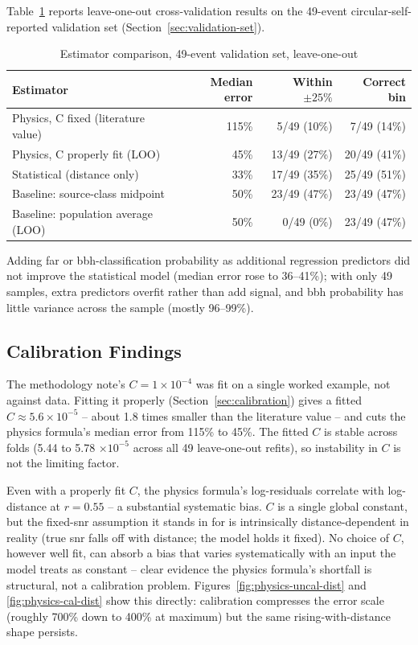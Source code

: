 Table~\ref{tab:results} reports leave-one-out cross-validation results on the 49-event circular-self-reported validation set (Section~\ref{sec:validation-set}).

\begin{table}[H]
\centering
\caption{Estimator comparison, 49-event validation set, leave-one-out}
\label{tab:results}
\begin{tabular}{@{}lrrr@{}}
\toprule
Estimator & Median error & Within $\pm25\%$ & Correct bin \\
\midrule
Physics, C fixed (literature value) & 115\% & 5/49 (10\%) & 7/49 (14\%) \\
Physics, C properly fit (LOO) & 45\% & 13/49 (27\%) & 20/49 (41\%) \\
Statistical (distance only) & 33\% & 17/49 (35\%) & 25/49 (51\%) \\
Baseline: source-class midpoint & 50\% & 23/49 (47\%) & 23/49 (47\%) \\
Baseline: population average (LOO) & 50\% & 0/49 (0\%) & 23/49 (47\%) \\
\bottomrule
\end{tabular}
\end{table}

Adding \gls{far} or \gls{bbh}-classification probability as additional regression predictors did not improve the statistical model (median error rose to 36--41\%); with only 49 samples, extra predictors overfit rather than add signal, and \gls{bbh} probability has little variance across the sample (mostly 96--99\%).

\subsection{Calibration Findings}

The methodology note's $C = 1\times10^{-4}$ was fit on a single worked example, not against data. Fitting it properly (Section~\ref{sec:calibration}) gives a fitted $C \approx 5.6\times10^{-5}$ -- about 1.8 times smaller than the literature value -- and cuts the physics formula's median error from 115\% to 45\%. The fitted $C$ is stable across folds (5.44 to 5.78 $\times10^{-5}$ across all 49 leave-one-out refits), so instability in $C$ is not the limiting factor.

Even with a properly fit $C$, the physics formula's log-residuals correlate with log-distance at $r = 0.55$ -- a substantial systematic bias. $C$ is a single global constant, but the fixed-\gls{snr} assumption it stands in for is intrinsically distance-dependent in reality (true \gls{snr} falls off with distance; the model holds it fixed). No choice of $C$, however well fit, can absorb a bias that varies systematically with an input the model treats as constant -- clear evidence the physics formula's shortfall is structural, not a calibration problem. Figures~\ref{fig:physics-uncal-dist} and \ref{fig:physics-cal-dist} show this directly: calibration compresses the error scale (roughly 700\% down to 400\% at maximum) but the same rising-with-distance shape persists.

